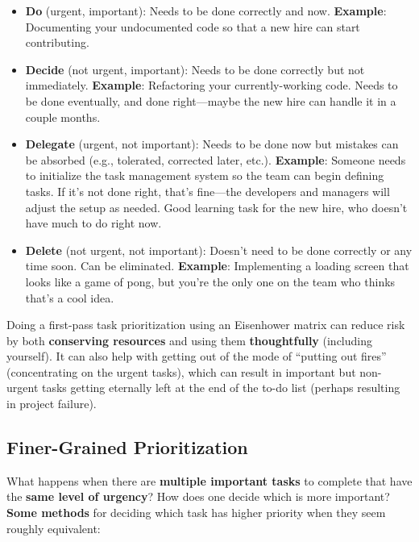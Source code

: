 \begin{itemize}
    \item \textbf{Do} (urgent, important): Needs to be done correctly and now. \textbf{Example}: Documenting your undocumented code so that a new hire can start contributing.
    \item \textbf{Decide} (not urgent, important): Needs to be done correctly but not immediately. \textbf{Example}: Refactoring your currently-working code. Needs to be done eventually, and done right---maybe the new hire can handle it in a couple months.
    \item \textbf{Delegate} (urgent, not important): Needs to be done now but mistakes can be absorbed (e.g., tolerated, corrected later, etc.). \textbf{Example}: Someone needs to initialize the task management system so the team can begin defining tasks. If it's not done right, that's fine---the developers and managers will adjust the setup as needed. Good learning task for the new hire, who doesn't have much to do right now.
    \item \textbf{Delete} (not urgent, not important): Doesn't need to be done correctly or any time soon. Can be eliminated. \textbf{Example}: Implementing a loading screen that looks like a game of pong, but you're the only one on the team who thinks that's a cool idea. 
\end{itemize}
Doing a first-pass task prioritization using an Eisenhower matrix can reduce risk by both \textbf{conserving resources} and using them \textbf{thoughtfully} (including yourself). It can also help with getting out of the mode of ``putting out fires'' (concentrating on the urgent tasks), which can result in important but non-urgent tasks getting eternally left at the end of the to-do list (perhaps resulting in project failure).

\subsection{Finer-Grained Prioritization}

What happens when there are \textbf{multiple important tasks} to complete that have the \textbf{same level of urgency}? How does one decide which is more important? \textbf{Some methods} for deciding which task has higher priority when they seem roughly equivalent:\\

